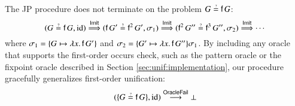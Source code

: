 \begin{exa}
The JP procedure does not terminate on the problem $G \unif \cst{f} \, G$:
\[(G \unif \cst{f} \, G, \makeop{id}) 
\overset{\textsf{Imit}}{\jpunifarrow}
(\cst{f}\,G' \unif \cst{f}^2 \, G', \sigma_1) 
\overset{\textsf{Imit}}{\jpunifarrow}
(\cst{f}^2 \, G'' \unif \cst{f}^3 \, G'', \sigma_2) 
\overset{\textsf{Imit}}{\jpunifarrow}\cdots\]
where $\sigma_1 = \{G \mapsto  \lambda x. \, \mathsf{f} \, G' \}$
and $\sigma_2 = \{G' \mapsto  \lambda x. \, \mathsf{f} \, G'' \}\sigma_1$.
By including any oracle that supports the first-order occurs check, such as the
pattern oracle or the fixpoint oracle described in Section \ref{sec:unif:implementation},
our procedure gracefully generalizes first-order unification: 
\[(\{G \unif \cst{f} \, G\}, \makeop{id}) 
\overset{\textsf{OracleFail}}{\newunifarrow}
\bot
\]
\end{exa}

